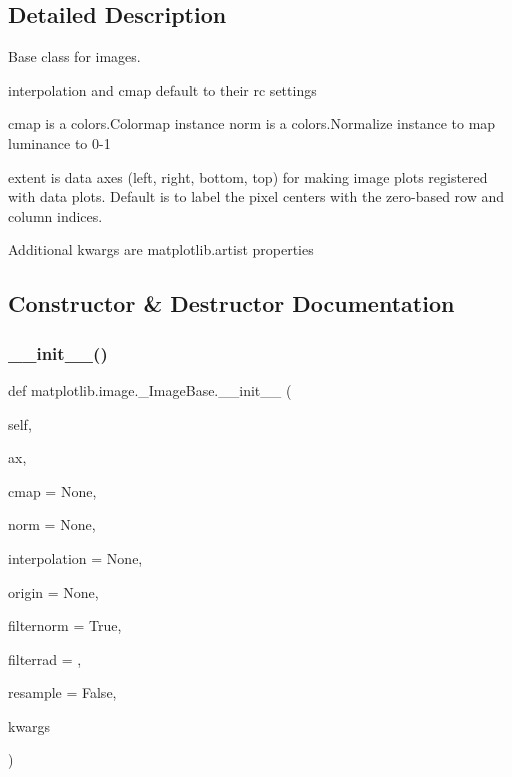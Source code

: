 \subsection{Detailed Description}
\begin{DoxyVerb}Base class for images.

interpolation and cmap default to their rc settings

cmap is a colors.Colormap instance
norm is a colors.Normalize instance to map luminance to 0-1

extent is data axes (left, right, bottom, top) for making image plots
registered with data plots.  Default is to label the pixel
centers with the zero-based row and column indices.

Additional kwargs are matplotlib.artist properties
\end{DoxyVerb}
 

\subsection{Constructor \& Destructor Documentation}
\mbox{\label{classmatplotlib_1_1image_1_1__ImageBase_a2cc198019d3aa6a9327753b13c0d6d6f}} 
\subsubsection{\texorpdfstring{\+\_\+\+\_\+init\+\_\+\+\_\+()}{\_\_init\_\_()}}
{\footnotesize\ttfamily def matplotlib.\+image.\+\_\+\+Image\+Base.\+\_\+\+\_\+init\+\_\+\+\_\+ (\begin{DoxyParamCaption}\item[{}]{self,  }\item[{}]{ax,  }\item[{}]{cmap = {\ttfamily None},  }\item[{}]{norm = {\ttfamily None},  }\item[{}]{interpolation = {\ttfamily None},  }\item[{}]{origin = {\ttfamily None},  }\item[{}]{filternorm = {\ttfamily True},  }\item[{}]{filterrad = {},  }\item[{}]{resample = {\ttfamily False},  }\item[{}]{kwargs }\end{DoxyParamCaption})}



